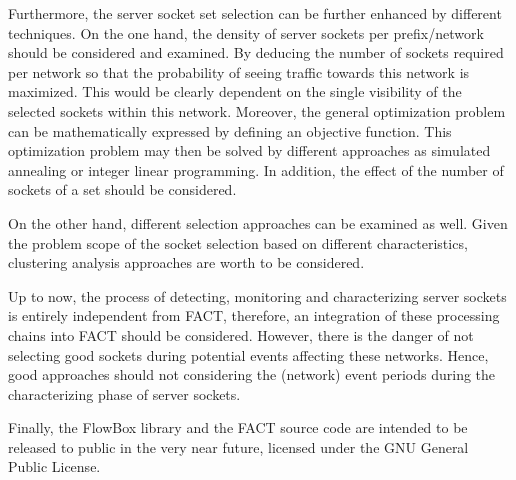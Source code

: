 Furthermore, the \gls{server socket} set selection can be further enhanced by different techniques.
On the one hand, the density of \glspl{server socket} per prefix/network should be considered and examined.
By deducing the number of sockets required per network so that the probability of seeing traffic towards this network is maximized.
This would be clearly dependent on the single visibility of the selected sockets within this network.
Moreover, the general optimization problem can be mathematically expressed by defining an objective function.
This optimization problem may then be solved by different approaches as simulated annealing or integer linear programming.
In addition, the effect of the number of sockets of a set should be considered. 

On the other hand, different selection approaches can be examined as well.
Given the problem scope of the socket selection based on different characteristics, clustering analysis approaches are worth to be considered. 

Up to now, the process of detecting, monitoring and characterizing \glspl{server socket} is entirely independent from \gls{FACT}, therefore, an integration of these processing chains into \gls{FACT} should be considered. 
However, there is the danger of not selecting good sockets during potential events affecting these networks.
Hence, good approaches should not considering the (network) event periods during the characterizing phase of \glspl{server socket}.

Finally, the FlowBox library and the \gls{FACT} source code are intended to be released to public in the very near future, licensed under the GNU General Public License.